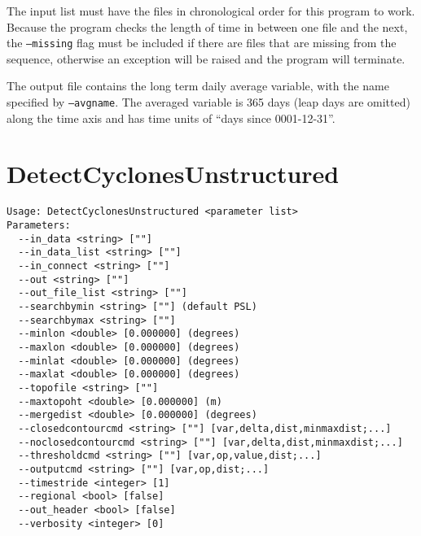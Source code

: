 \documentclass{article}
\begin{document}
The input list must have the files in chronological order for this program to work. Because the program checks the length of time in between one file and the next, the \texttt{--missing} flag must be included if there are files that  are missing from the sequence, otherwise an exception will be raised and the program will terminate.

The output file contains the long term daily average variable, with the name specified by \texttt{--avgname}. The averaged variable is 365 days (leap days are omitted) along the time axis and has time units of ``days since 0001-12-31''.









\section{DetectCyclonesUnstructured}

\begin{verbatim}
Usage: DetectCyclonesUnstructured <parameter list>
Parameters:
  --in_data <string> [""] 
  --in_data_list <string> [""]
  --in_connect <string> [""] 
  --out <string> [""] 
  --out_file_list <string> [""]
  --searchbymin <string> [""] (default PSL)
  --searchbymax <string> [""] 
  --minlon <double> [0.000000] (degrees)
  --maxlon <double> [0.000000] (degrees)
  --minlat <double> [0.000000] (degrees)
  --maxlat <double> [0.000000] (degrees)
  --topofile <string> [""] 
  --maxtopoht <double> [0.000000] (m)
  --mergedist <double> [0.000000] (degrees)
  --closedcontourcmd <string> [""] [var,delta,dist,minmaxdist;...]
  --noclosedcontourcmd <string> [""] [var,delta,dist,minmaxdist;...]
  --thresholdcmd <string> [""] [var,op,value,dist;...]
  --outputcmd <string> [""] [var,op,dist;...]
  --timestride <integer> [1] 
  --regional <bool> [false] 
  --out_header <bool> [false] 
  --verbosity <integer> [0] 
\end{verbatim}
\end{document}

